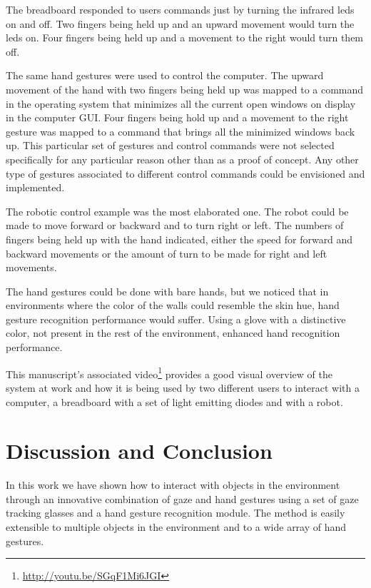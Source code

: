 \documentclass[jou,a4paper,notxfonts]{apa}
\begin{document}
The breadboard responded to users commands just by turning the infrared leds on and off. Two fingers being held up and
an upward movement would turn the leds on. Four fingers being held up and a movement to the right would turn them off.

The same hand gestures were used to control the computer. The upward movement of the hand with two fingers being held up
was mapped to a command in the operating system that minimizes all the current open windows on display in the computer
GUI. Four fingers being hold up and a movement to the right gesture was mapped to a command that brings all the
minimized windows back up. This particular set of gestures and control commands were not selected specifically for
any particular reason other than as a proof of concept. Any other type of gestures associated to different
control commands could be envisioned and implemented.

The robotic control example was the most elaborated one. The robot could be made to move forward or backward and to turn right or
left. The numbers of fingers being held up with the hand indicated, either the speed for forward and backward movements
or the amount of turn to be made for right and left movements.

The hand gestures could be done with bare hands, but we noticed that in environments where the color of the walls could
resemble the skin hue, hand gesture recognition performance would suffer. Using a glove with a distinctive color, not 
present in the rest of the environment, enhanced hand recognition performance.

This manuscript's associated video\footnote{\url{http://youtu.be/SGqF1Mi6JGI}} provides a good visual overview of the system at work and how it is being used by two different users to interact with a computer, a breadboard
with a set of light emitting diodes and with a robot.


\section{Discussion and Conclusion}
In this work we have shown how to interact with objects in the environment through an innovative combination of gaze and
hand gestures using a set of gaze tracking glasses and a hand gesture recognition module. The method is easily
extensible to multiple objects in the environment and to a wide array of hand gestures.
\end{document}

